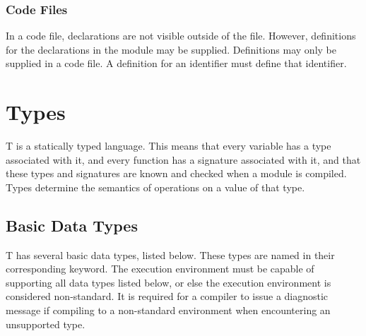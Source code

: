 \documentclass[letterpaper,12pt]{book}
\begin{document}
\subsection{Code Files}

In a code file, declarations are not visible outside of the file. However, definitions for the declarations in the module may be supplied. Definitions may only be supplied in a code file. A definition for an identifier must define that identifier.

\chapter{Types}

T is a statically typed language. This means that every variable has a type associated with it, and every function has a signature associated with it, and that these types and signatures are known and checked when a module is compiled. Types determine the semantics of operations on a value of that type.

\section{Basic Data Types}

T has several basic data types, listed below. These types are named in their corresponding keyword. The execution environment must be capable of supporting all data types listed below, or else the execution environment is considered non-standard. It is required for a compiler to issue a diagnostic message if compiling to a non-standard environment when encountering an unsupported type.
\end{document}
